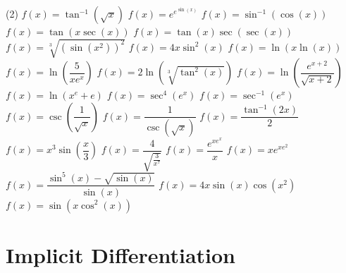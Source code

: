 \documentclass[10pt,oneside,]{book}
\theoremstyle{plain}
\theoremstyle{definition}
\numberwithin{equation}{section}
\newcommand{\fe}[2]{#1\mathopen{}\left(#2\right)\mathclose{}}
\begin{document}
\begin{exercisegroup}(2)
\exercise[16.]\hypertarget{exercise-497}{\null}\(\fe{f}{x}=\fe{\tan^{-1}}{\sqrt{x}}\)%
\exercise[17.]\hypertarget{exercise-498}{\null}\(\fe{f}{x}=e^{e^{\fe{\sin}{x}}}\)%
\exercise[18.]\hypertarget{exercise-499}{\null}\(\fe{f}{x}=\fe{\sin^{-1}}{\fe{\cos}{x}}\)%
\exercise[19.]\hypertarget{exercise-500}{\null}\(\fe{f}{x}=\fe{\tan}{x\fe{\sec}{x}}\)%
\exercise[20.]\hypertarget{exercise-501}{\null}\(\fe{f}{x}=\fe{\tan}{x}\fe{\sec}{\fe{\sec}{x}}\)%
\exercise[21.]\hypertarget{exercise-502}{\null}\(\fe{f}{x}=\sqrt[3]{\left(\fe{\sin}{x^2}\right)^2}\)%
\exercise[22.]\hypertarget{exercise-503}{\null}\(\fe{f}{x}=4x\fe{\sin^2}{x}\)%
\exercise[23.]\hypertarget{exercise-504}{\null}\(\fe{f}{x}=\fe{\ln}{x\fe{\ln}{x}}\)%
\exercise[24.]\hypertarget{exercise-505}{\null}\(\fe{f}{x}=\fe{\ln}{\dfrac{5}{xe^x}}\)%
\exercise[25.]\hypertarget{exercise-506}{\null}\(\fe{f}{x}=2\fe{\ln}{\sqrt[3]{\fe{\tan^2}{x}}}\)%
\exercise[26.]\hypertarget{exercise-507}{\null}\(\fe{f}{x}=\fe{\ln}{\dfrac{e^{x+2}}{\sqrt{x+2}}}\)%
\exercise[27.]\hypertarget{exercise-508}{\null}\(\fe{f}{x}=\fe{\ln}{x^e+e}\)%
\exercise[28.]\hypertarget{exercise-509}{\null}\(\fe{f}{x}=\fe{\sec^4}{e^x}\)%
\exercise[29.]\hypertarget{exercise-510}{\null}\(\fe{f}{x}=\fe{\sec^{-1}}{e^x}\)%
\exercise[30.]\hypertarget{exercise-511}{\null}\(\fe{f}{x}=\fe{\csc}{\dfrac{1}{\sqrt{x}}}\)%
\exercise[31.]\hypertarget{exercise-512}{\null}\(\fe{f}{x}=\dfrac{1}{\fe{\csc}{\sqrt{x}}}\)%
\exercise[32.]\hypertarget{exercise-513}{\null}\(\fe{f}{x}=\dfrac{\fe{\tan^{-1}}{2x}}{2}\)%
\exercise[33.]\hypertarget{exercise-514}{\null}\(\fe{f}{x}=x^3\fe{\sin}{\dfrac{x}{3}}\)%
\exercise[34.]\hypertarget{exercise-515}{\null}\(\fe{f}{x}=\dfrac{4}{\sqrt{\frac{3}{x^7}}}\)%
\exercise[35.]\hypertarget{exercise-516}{\null}\(\fe{f}{x}=\dfrac{e^{xe^x}}{x}\)%
\exercise[36.]\hypertarget{exercise-517}{\null}\(\fe{f}{x}=xe^{xe^2}\)%
\exercise[37.]\hypertarget{exercise-518}{\null}\(\fe{f}{x}=\dfrac{\fe{\sin^5}{x}-\sqrt{\fe{\sin}{x}}}{\fe{\sin}{x}}\)%
\exercise[38.]\hypertarget{exercise-519}{\null}\(\fe{f}{x}=4x\fe{\sin}{x}\fe{\cos}{x^2}\)%
\exercise[39.]\hypertarget{exercise-520}{\null}\(\fe{f}{x}=\fe{\sin}{x\fe{\cos^2}{x}}\)%
\end{exercisegroup}
\par\smallskip\noindent
\typeout{************************************************}
\typeout{************************************************}
\chapter[Implicit Differentiation]{Implicit Differentiation}\label{chapter-implicit-differentiation}
\typeout{************************************************}
\typeout{************************************************}
\end{document}
